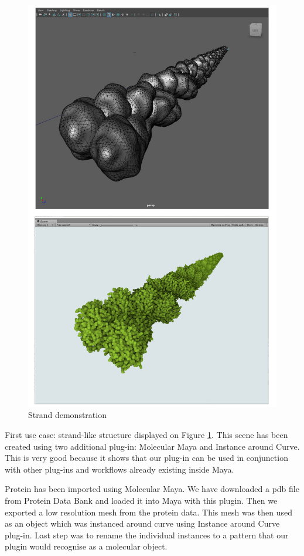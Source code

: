 \documentclass[
  digital, %
  table,   %
  nolof,     %
  nolot,     %
]{fithesis3}
\begin{document}
\begin{figure}
  \centering
  \includegraphics[scale=0.4]{images/strand-1-vertical.jpg}
  \caption{Strand demonstration}
  \label{fig:strand1}
\end{figure}

First use case: strand-like structure displayed on Figure \ref{fig:strand1}. This scene has been created using two additional plug-in: Molecular Maya and Instance around Curve. This is very good because it shows that our plug-in can be used in conjunction with other plug-ins and workflows already existing inside Maya.

Protein has been imported using Molecular Maya. We have downloaded a pdb file from Protein Data Bank and loaded it into Maya with this plugin. Then we exported a low resolution mesh from the protein data. This mesh was then used as an object which was instanced around curve using Instance around Curve plug-in. Last step was to rename the individual instances to a pattern that our plugin would recognise as a molecular object.
\end{document}

